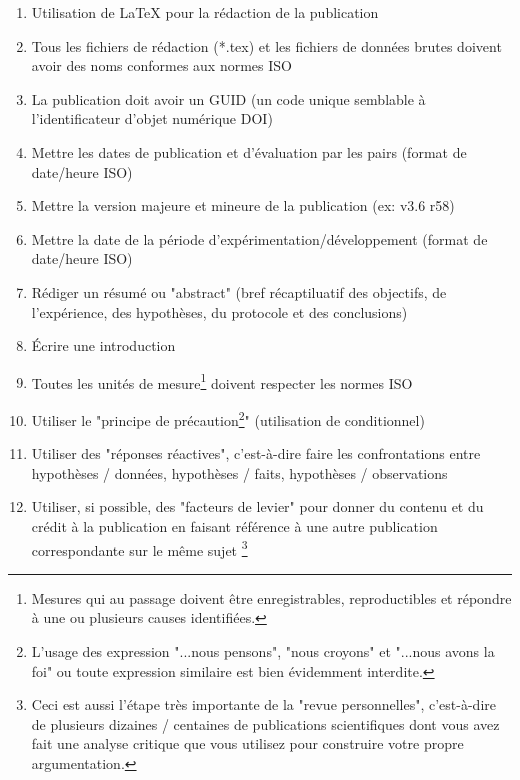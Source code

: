 	\begin{enumerate}
		\item Utilisation de \LaTeX{} pour la rédaction de la publication
		
		\item Tous les fichiers de rédaction (*.tex) et les fichiers de données brutes doivent avoir des noms conformes aux normes ISO
		
		\item La publication doit avoir un GUID (un code unique semblable à l'identificateur d'objet numérique DOI)
		
		\item Mettre les dates de publication et d'évaluation par les pairs (format de date/heure ISO)
		
		\item Mettre la version majeure et mineure de la publication (ex: v3.6 r58) 
		
		\item Mettre la date de la période d'expérimentation/développement (format de date/heure ISO) 
		
		\item Rédiger un résumé ou "abstract" (bref récaptiluatif des objectifs, de l'expérience, des hypothèses, du protocole et des conclusions)
		
		\item Écrire une introduction
		
		\item Toutes les unités de mesure\footnote{Mesures qui au passage doivent être enregistrables, reproductibles et répondre à une ou plusieurs causes identifiées.} doivent respecter les normes ISO
		
		\item Utiliser le "principe de précaution\footnote{L'usage des expression "...nous pensons", "nous croyons" et "...nous avons la foi" ou toute expression similaire est bien évidemment interdite.}" (utilisation de conditionnel)
		
		\item Utiliser des "réponses réactives", c'est-à-dire faire les confrontations entre hypothèses / données, hypothèses / faits, hypothèses / observations
		
		\item Utiliser, si possible, des "facteurs de levier" pour donner du contenu et du crédit à la publication en faisant référence à une autre publication correspondante sur le même sujet \footnote{Ceci est aussi l'étape très importante de la "revue personnelles", c'est-à-dire de plusieurs dizaines / centaines de publications scientifiques dont vous avez fait une analyse critique que vous utilisez pour construire votre propre argumentation.}
		

\end{enumerate}
